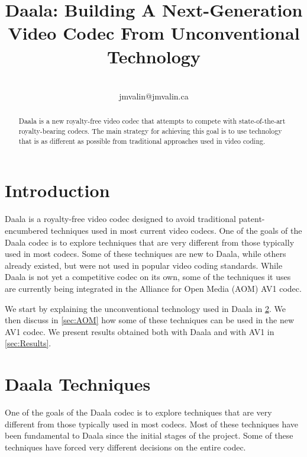 \documentclass[english,conference,10pt]{IEEEtran}
\begin{document}
\title{Daala: Building A Next-Generation Video Codec From Unconventional
Technology}


\author{\\
jmvalin@jmvalin.ca
}
\maketitle
\begin{abstract}
Daala is a new royalty-free video codec that attempts to compete with
state-of-the-art royalty-bearing codecs. The main strategy for achieving this
goal is to use technology that is as different as possible from traditional
approaches used in video coding.
\end{abstract}


\section{Introduction}

Daala is a royalty-free video codec designed to avoid traditional
patent-encumbered techniques used in most current video codecs. One
of the goals of the Daala codec is to explore techniques that are
very different from those typically used in most codecs. Some of
these techniques are new to Daala, while others already existed, but
were not used in popular video coding standards. While Daala is not yet
a competitive codec on its own, some of the techniques it uses are
currently being integrated in the Alliance for Open Media (AOM) AV1 codec.

We start by explaining the unconventional technology used in Daala
in \cref{sec:techniques}. We then discuss in \cref{sec:AOM} how some of
these techniques can be used in the new AV1 codec. We present results
obtained both with Daala and with AV1 in \cref{sec:Results}.

\section{Daala Techniques}
\label{sec:techniques}

One of the goals of the Daala codec is to explore techniques that
are very different from those typically used in most codecs. Most
of these techniques have been fundamental to Daala since the initial
stages of the project. Some of these techniques have forced very different
decisions on the entire codec.
\end{document}

